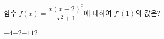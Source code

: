 함수 $f(x)=\dfrac{x(x-2)^2}{x^2+1}$에 대하여 $f'(1)$의 값은?
\begin{choices32}{$-4$}{$-2$}{$-1$}{$1$}{$2$}\end{choices32}
